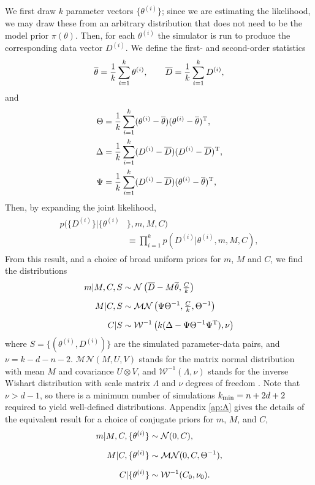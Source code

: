 \documentclass[%
 reprint,
 amsmath,amssymb,
 aps,
]{revtex4-2}
\begin{document}
We first draw $k$ parameter vectors $\{\theta^{(i)}\}$;  since we are estimating the likelihood, we may draw these from an arbitrary distribution that does not need to be the model prior $\pi(\theta)$. Then, for each $\theta^{(i)}$ the simulator is run to produce the corresponding data vector $D^{(i)}$. We define the first- and second-order statistics
\begin{align}\label{eq:means}
	\overline{\theta} = \frac{1}{k}\sum^k_{i=1} \theta^{(i)}, \qquad \overline{D} = \frac{1}{k}\sum^k_{i=1} D^{(i)},
\end{align}
and
\begin{align}
	\Theta 	&= \frac{1}{k}\sum^k_{i=1} (\theta^{(i)}-\overline{\theta})(\theta^{(i)}-\overline{\theta})^{\mathrm{T}}, \\
    \Delta 	&= \frac{1}{k}\sum^k_{i=1} ( D^{(i)}-\overline{ D})( D^{(i)}-\overline{D})^{\mathrm{T}}, \\
    \Psi 	&= \frac{1}{k}\sum^k_{i=1} ( D^{(i)}-\overline{D})(\theta^{(i)}-\overline{\theta})^{\mathrm{T}}, \label{eq:covs}
\end{align}
Then, by expanding the joint likelihood,
\begin{align}
\begin{aligned}
	p(\{D^{(i)}\}|\{\theta^{(i)}&\},m,M,C)\\
	& \equiv {\textstyle\prod}_{i=1}^k  p(D^{(i)}|\theta^{(i)},m,M,C),	
\end{aligned}
\end{align}
From this result, and a choice of broad uniform priors for $m$, $M$ and $C$, we find the distributions
\begin{align}
	\label{eq:p_m}
	m|M,C,S &\sim \mathcal{N}\left( \overline{D}-M\overline{\theta},\tfrac{C}{k}  \right)\\[2mm]
	\label{eq:p_M}
	M|C,S &\sim \mathcal{MN}\left( \Psi\Theta^{-1},\tfrac{C}{k},\Theta^{-1}  \right)\\[2mm]
	\label{eq:p_C}
	C|S &\sim \mathcal{W}^{-1}\left( k(\Delta -  \Psi \Theta^{-1}\Psi^{\mathrm{T}}), \nu  \right)
\end{align}
where $S = \{(\theta^{(i)},D^{(i)})\}$ are the simulated parameter-data pairs, and $\nu = k-d-n-2$. $\mathcal{MN}(M,U,V)$ stands for the matrix normal distribution with mean $M$ and covariance $U\otimes V$, and $\mathcal{W}^{-1}(\Lambda,\nu)$ stands for the inverse Wishart distribution with scale matrix $\Lambda$ and $\nu$ degrees of freedom \cite{gupta2018matrix}. Note that $\nu>d-1$, so there is a minimum number of simulations $k_\text{min} = n+2d+2$ required to yield well-defined distributions. Appendix \ref{ap:A} gives the details of the equivalent result for a choice of conjugate priors for $m$, $M$, and $C$,
\begin{align}
	 m|M,C,\{\theta^{(i)}\}  &\sim  \mathcal{N}(0,C),  \\[2mm]
	 M|C,\{\theta^{(i)}\}  &\sim  \mathcal{MN}(0,C,\Theta^{-1}),  \\[2mm]
	 C|\{\theta^{(i)}\}  &\sim  \mathcal{W}^{-1}(C_0,\nu_0).
\end{align}
\end{document}
